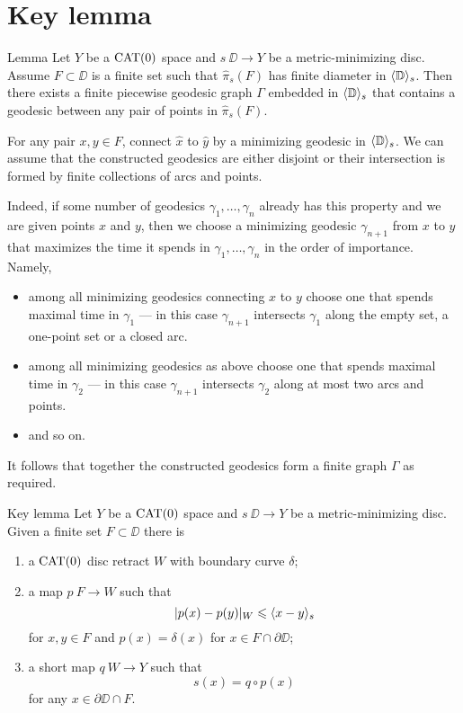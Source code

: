\section{Key lemma}\label{Key Lemma}


\begin{thm}{Lemma}\label{lem:graph}
Let $Y$ be a $\mathop{\rm CAT}\nolimits(0)$ space and $s\:\DD\to Y$ 
be a metric-minimizing disc.
Assume $F\subset \DD$ is a finite set such that $\hat\pi_s(F)$ has finite
diameter in $\langle\mathbb{D}\rangle_s$.
Then there exists a finite piecewise geodesic graph $\Gamma$ embedded in $\langle\mathbb{D}\rangle_s$ that contains a geodesic between any pair of points in $\hat\pi_s(F)$.
\end{thm} 

For any pair $x,y\in F$, connect $\hat x$ to $\hat y$ by a minimizing geodesic in $\langle\mathbb{D}\rangle_s$. 
We can assume that the constructed geodesics 
are either disjoint or their intersection is formed by finite collections of arcs and points.

Indeed, if some number of geodesics $\gamma_1,\dots,\gamma_n$ already has this property and we are given points $x$ and $y$, then
we choose a minimizing geodesic $\gamma_{n+1}$ from $x$ to $y$ that maximizes the time it spends in $\gamma_1,\dots,\gamma_n$  
in the order of importance.
Namely, 
\begin{itemize}
\item  among all minimizing geodesics connecting $x$ to $y$
choose one that spends maximal time in $\gamma_1$ --- in this case $\gamma_{n+1}$ intersects $\gamma_1$ along the empty set, 
a one-point set or a closed arc.
\item among all minimizing geodesics as above
choose one that spends maximal time in $\gamma_2$ --- in this case $\gamma_{n+1}$ intersects $\gamma_2$ along at most two arcs and points.
\item and so on.
\end{itemize}

It follows that together the constructed geodesics form a finite graph $\Gamma$ as required.
\qeds



\begin{thm}{Key lemma}\label{lem:key}
Let $Y$ be a $\mathop{\rm CAT}\nolimits(0)$ space and $s\:\DD\to Y$ 
be a metric-minimizing disc.
Given a finite set $F\subset \DD$
there is 
\begin{enumerate}[(1)]
	\item a $\mathop{\rm CAT}\nolimits(0)$ disc retract $W$ with boundary curve $\delta$;
	\item a map $p\:F\to W$ such that
\[|p(x)-p(y)|_W\leqslant \langle x-y\rangle_s\] 
for $x,y\in F$ and $p(x)=\delta(x)$ for $x\in F\cap \partial\DD$;
  \item a short map $q\:W\to Y$ such that
\[s(x)=q\circ p(x)\] 
for any $x\in\partial\DD\cap F$.
\end{enumerate}
 
\end{thm} 


